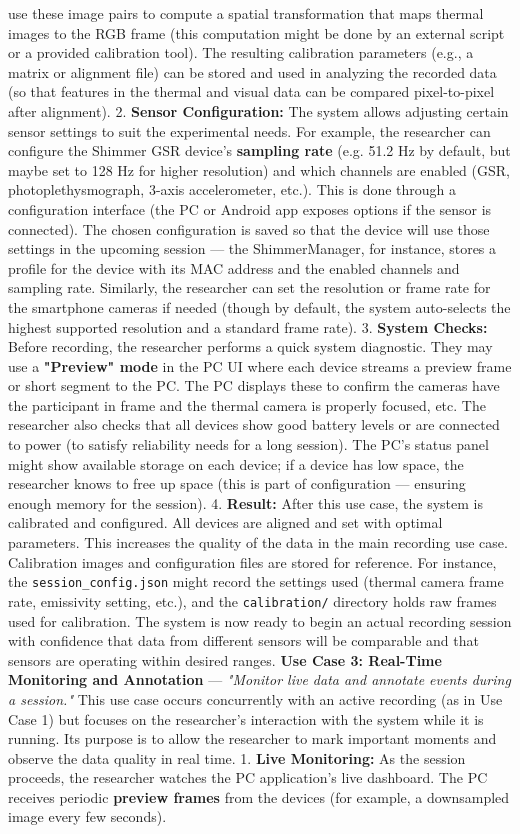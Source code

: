 use these image pairs to compute a spatial transformation that maps thermal images to the RGB frame (this computation might be done by an external script or a provided calibration tool). The resulting calibration parameters (e.g., a matrix or alignment file) can be stored and used in analyzing the recorded data (so that features in the thermal and visual data can be compared pixel-to-pixel after alignment). 2. \textbf{Sensor Configuration:} The system allows adjusting certain sensor settings to suit the experimental needs. For example, the researcher can configure the Shimmer GSR device's \textbf{sampling rate} (e.g. 51.2 Hz by default, but maybe set to 128 Hz for higher resolution) and which channels are enabled (GSR, photoplethysmograph, 3-axis accelerometer, etc.). This is done through a configuration interface (the PC or Android app exposes options if the sensor is connected). The chosen configuration is saved so that the device will use those settings in the upcoming session --- the ShimmerManager, for instance, stores a profile for the device with its MAC address and the enabled channels and sampling rate. Similarly, the researcher can set the resolution or frame rate for the smartphone cameras if needed (though by default, the system auto-selects the highest supported resolution and a standard frame rate). 3. \textbf{System Checks:} Before recording, the researcher performs a quick system diagnostic. They may use a \textbf{"Preview" mode} in the PC UI where each device streams a preview frame or short segment to the PC. The PC displays these to confirm the cameras have the participant in frame and the thermal camera is properly focused, etc. The researcher also checks that all devices show good battery levels or are connected to power (to satisfy reliability needs for a long session). The PC's status panel might show available storage on each device; if a device has low space, the researcher knows to free up space (this is part of configuration --- ensuring enough memory for the session). 4. \textbf{Result:} After this use case, the system is calibrated and configured. All devices are aligned and set with optimal parameters. This increases the quality of the data in the main recording use case. Calibration images and configuration files are stored for reference. For instance, the \texttt{session\_config.json} might record the settings used (thermal camera frame rate, emissivity setting, etc.), and the \texttt{calibration/} directory holds raw frames used for calibration. The system is now ready to begin an actual recording session with confidence that data from different sensors will be comparable and that sensors are operating within desired ranges. \textbf{Use Case 3: Real-Time Monitoring and Annotation} --- \textit{"Monitor live data and annotate events during a session."} This use case occurs concurrently with an active recording (as in Use Case 1) but focuses on the researcher's interaction with the system while it is running. Its purpose is to allow the researcher to mark important moments and observe the data quality in real time. 1. \textbf{Live Monitoring:} As the session proceeds, the researcher watches the PC application's live dashboard. The PC receives periodic \textbf{preview frames} from the devices (for example, a downsampled image every few seconds). 
